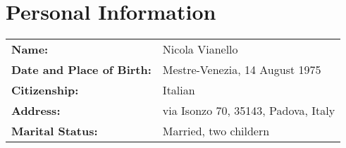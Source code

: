 \section{Personal Information}
\begin{tabular}{ll}
\textbf{Name:} & Nicola Vianello \\
\textbf{Date and Place of Birth:} & Mestre-Venezia, 14 August 1975 \\
\textbf{Citizenship:} & Italian \\
\textbf{Address:} & via Isonzo 70, 35143, Padova, Italy \\
\textbf{Marital Status:} & Married, two childern
\end{tabular}
